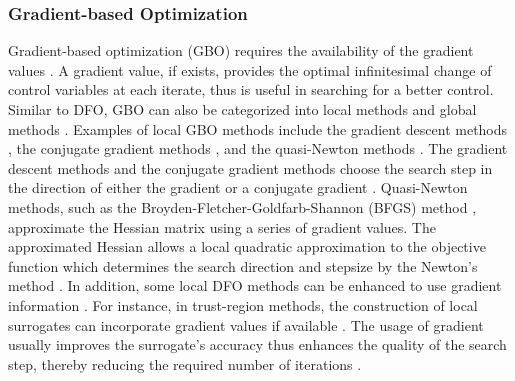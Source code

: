 \subsubsection{Gradient-based Optimization}
\label{section: GBO}
Gradient-based optimization (GBO) requires the availability of the gradient values \cite{opt via sim review, nonlinear program}. 
A gradient value, if exists,
provides the optimal infinitesimal change of control variables at each iterate,
thus is useful in searching for a better control.
Similar to DFO, GBO can also be categorized into local methods and global methods \cite{opt via sim review}.
Examples of local GBO methods include the gradient descent methods 
\cite{stochastic search, backtrack line search}, the conjugate gradient 
methods \cite{linear conjugate gradient, nonlinear conjugate gradient}, and the quasi-Newton methods \cite{quasiNewton, LBFGS}. 
The gradient descent methods and
the conjugate gradient methods
choose the search step in the direction of either the gradient \cite{stochastic search, backtrack line search} or a conjugate gradient
\cite{linear conjugate gradient, nonlinear conjugate gradient}.
Quasi-Newton methods, such as the Broyden-Fletcher-Goldfarb-Shannon (BFGS) method
\cite{quasiNewton},
approximate the Hessian matrix using a series of gradient values. The approximated Hessian allows
a local quadratic approximation to the objective function which determines the search direction
and stepsize
by the Newton's method \cite{quasiNewton}. 
In addition, some local DFO methods can be enhanced to use gradient information \cite{trust region global, trust region inexact grad}. 
For instance,
in trust-region methods, the construction of local surrogates can incorporate 
gradient values if available \cite{trust region global, trust region inexact grad}.
The usage of gradient usually improves the surrogate's accuracy thus enhances the quality
of the search step, thereby reducing the required number of iterations
\cite{trust region global, trust region inexact grad}.\\

